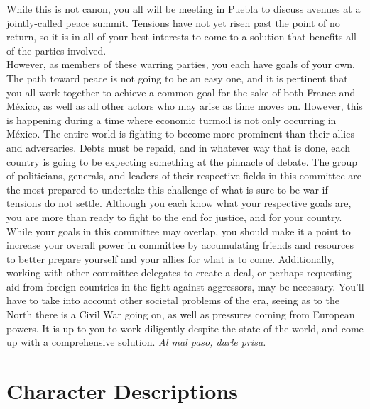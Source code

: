 \documentclass[10pt, letterpaper]{article}
\begin{document}
While this is not canon, you all will be meeting in Puebla to discuss
avenues at a jointly-called peace summit. Tensions have not yet risen
past the point of no return, so it is in all of your best interests to
come to a solution that benefits all of the parties involved. \\

However, as members of these warring parties, you each have goals of
your own. The path toward peace is not going to be an easy one, and it
is pertinent that you all work together to achieve a common goal for the
sake of both France and México, as well as all other actors who may
arise as time moves on. However, this is happening during a time where
economic turmoil is not only occurring in México. The entire world is
fighting to become more prominent than their allies and adversaries.
Debts must be repaid, and in whatever way that is done, each country is
going to be expecting something at the pinnacle of debate. The group of
politicians, generals, and leaders of their respective fields in this
committee are the most prepared to undertake this challenge of what is
sure to be war if tensions do not settle. Although you each know what
your respective goals are, you are more than ready to fight to the end
for justice, and for your country. \\

While your goals in this committee may overlap, you should make it a
point to increase your overall power in committee by accumulating
friends and resources to better prepare yourself and your allies for
what is to come. Additionally, working with other committee delegates to
create a deal, or perhaps requesting aid from foreign countries in the
fight against aggressors, may be necessary. You'll have to take into
account other societal problems of the era, seeing as to the North there
is a Civil War going on, as well as pressures coming from European
powers. It is up to you to work diligently despite the state of the
world, and come up with a comprehensive solution. \emph{Al mal paso,
darle prisa.} \\

\newpage
\section{{Character Descriptions}}
\end{document}
